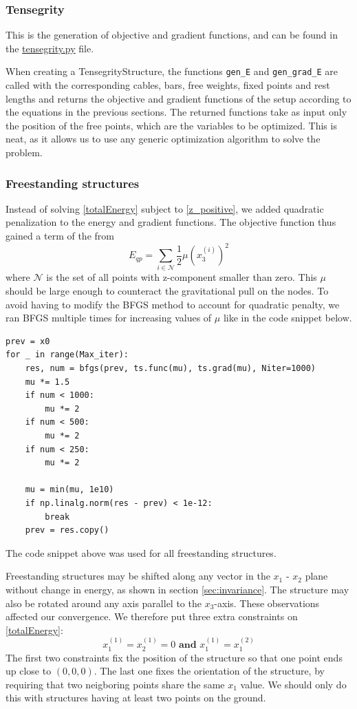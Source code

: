 \subsubsection{Tensegrity}
This is the generation of objective and gradient functions, and can be found in the \href{https://github.com/otkulseng/Opt1_Project/blob/main/Kode/tensegrity.py}{tensegrity.py} file. 

When creating a TensegrityStructure, the functions \lstinline{gen_E}  and \lstinline{gen_grad_E} are called with the corresponding cables, bars, free weights, fixed points and rest lengths and returns the objective and gradient functions of the setup according to the equations in the previous sections. The returned functions take as input only the position of the free points, which are the variables to be optimized. This is neat, as it allows us to use any generic optimization algorithm to solve the problem.

\subsubsection{Freestanding structures}
Instead of solving \eqref{totalEnergy} subject to \eqref{z_positive}, we added quadratic penalization to the energy and gradient functions. The objective function thus gained a term of the from 
\begin{equation}
    E_{qp} = \sum_{i \in \mathcal{N}} \frac{1}{2} \mu (x_3^{(i)})^2
\end{equation}
where $\mathcal{N}$ is the set of all points with z-component smaller than zero. This $\mu$ should be large enough to counteract the gravitational pull on the nodes. To avoid having to modify the BFGS method to account for quadratic penalty, we ran BFGS multiple times for increasing values of $\mu$ like in the code snippet below.
\begin{lstlisting}
prev = x0
for _ in range(Max_iter):
    res, num = bfgs(prev, ts.func(mu), ts.grad(mu), Niter=1000)
    mu *= 1.5
    if num < 1000:
        mu *= 2
    if num < 500:
        mu *= 2
    if num < 250:
        mu *= 2

    mu = min(mu, 1e10)
    if np.linalg.norm(res - prev) < 1e-12:
        break
    prev = res.copy()
\end{lstlisting}
The code snippet above was used for all freestanding structures.

Freestanding structures may be shifted along any vector in the $x_1$ - $x_2$ plane without change in energy, as shown in section \ref{sec:invariance}. The structure may also be rotated around any axis parallel to the $x_3$-axis. These observations affected our convergence. We therefore put three extra constraints on \ref{totalEnergy}:
\begin{equation}
    x_{1}^{(1)} = x_{2}^{(1)} = 0 \textbf{ and } x_{1}^{(1)} = x_{1}^{(2)}
\end{equation}
The first two constraints fix the position of the structure so that one point ends up close to $(0, 0, 0)$. The last one fixes the orientation of the structure, by requiring that two neigboring points share the same $x_1$ value. We should only do this with structures having at least two points on the ground. 

